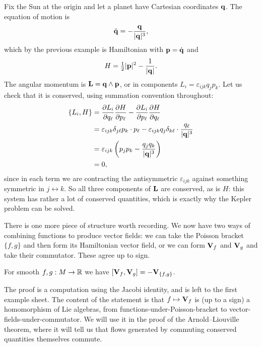 \documentclass[a4paper]{scrartcl}
\begin{document}
\begin{example}
	Fix the Sun at the origin and let a planet have Cartesian coordinates $\mathbf{q}$. The equation of motion is
	$$
	\ddot{\mathbf{q}} = -\frac{\mathbf{q}}{|\mathbf{q}|^3},
	$$
	which by the previous example is Hamiltonian with $\mathbf{p} = \dot{\mathbf{q}}$ and
	$$
	H = \tfrac{1}{2}|\mathbf{p}|^2 - \frac{1}{|\mathbf{q}|}.
	$$
	The angular momentum is $\mathbf{L} = \mathbf{q} \wedge \mathbf{p}$, or in components $L_i = \varepsilon_{ijk}q_j p_k$. Let us check that it is conserved, using summation convention throughout:
	\begin{align*}
		\{L_i, H\} &= \frac{\partial L_i}{\partial q_\ell}\frac{\partial H}{\partial p_\ell} - \frac{\partial L_i}{\partial p_\ell}\frac{\partial H}{\partial q_\ell}\\
		&= \varepsilon_{ijk}\delta_{j\ell}p_k \cdot p_\ell - \varepsilon_{ijk}q_j\delta_{k\ell}\cdot \frac{q_\ell}{|\mathbf{q}|^3}\\
		&= \varepsilon_{ijk}\left(p_j p_k - \frac{q_j q_k}{|\mathbf{q}|^3}\right)\\
		&= 0,
	\end{align*}
	since in each term we are contracting the antisymmetric $\varepsilon_{ijk}$ against something symmetric in $j \leftrightarrow k$. So all three components of $\mathbf{L}$ are conserved, as is $H$: this system has rather a lot of conserved quantities, which is exactly why the Kepler problem can be solved.
\end{example}

There is one more piece of structure worth recording. We now have two ways of combining functions to produce vector fields: we can take the Poisson bracket $\{f,g\}$ and then form its Hamiltonian vector field, or we can form $\mathbf{V}_f$ and $\mathbf{V}_g$ and take their commutator. These agree up to sign.

\begin{proposition}
	For smooth $f,g : M \to \mathbb{R}$ we have $[\mathbf{V}_f, \mathbf{V}_g] = -\mathbf{V}_{\{f,g\}}$.
\end{proposition}

The proof is a computation using the Jacobi identity, and is left to the first example sheet. The content of the statement is that $f \mapsto \mathbf{V}_f$ is (up to a sign) a homomorphism of Lie algebras, from functions-under-Poisson-bracket to vector-fields-under-commutator. We will use it in the proof of the Arnold--Liouville theorem, where it will tell us that flows generated by commuting conserved quantities themselves commute.
\end{document}
